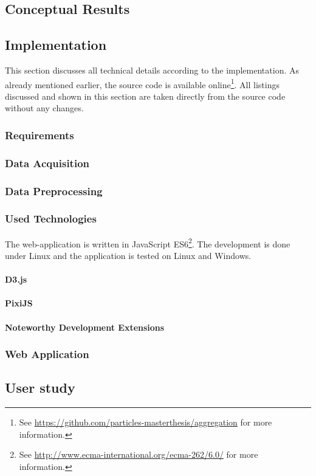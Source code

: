 \subsection{Conceptual Results}


\subsection{Implementation}
This section discusses all technical details according to the implementation. As already mentioned earlier, the source code is available online\footnote{See \href{https://github.com/particles-masterthesis/aggregation}{https://github.com/particles-masterthesis/aggregation} for more information.}. All listings discussed and shown in this section are taken directly from the source code without any changes.

\subsubsection{Requirements}


\subsubsection{Data Acquisition}
\label{s:data-acquisition}


\subsubsection{Data Preprocessing}
\label{s:data-preprocessing}


\subsubsection{Used Technologies}
The web-application is written in JavaScript ES6\footnote{See \href{http://www.ecma-international.org/ecma-262/6.0/}{http://www.ecma-international.org/ecma-262/6.0/} for more information.}. The development is done under Linux and the application is tested on Linux and Windows.

\paragraph{D3.js}


\paragraph{PixiJS}


\paragraph{Noteworthy Development Extensions}


\subsubsection{Web Application}
\label{s:web-application}


\subsection{User study}


